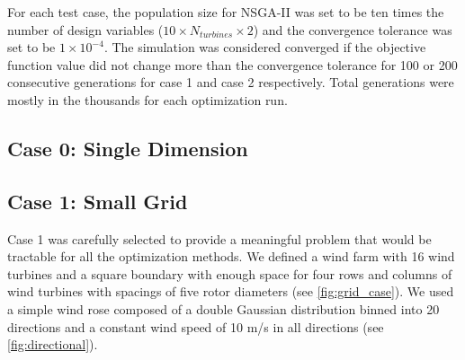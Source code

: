 \documentclass[a4paper]{jpconf}
\begin{document}
For each test case, the population size for NSGA-II was set to be ten times the number of design variables ($10\times N_{turbines} \times 2$) and the convergence tolerance was set to be $1\times10^{-4}$. The simulation was considered converged if the objective function value did not change more than the convergence tolerance for 100 or 200 consecutive generations for case 1 and case 2 respectively. Total generations were mostly in the thousands for each optimization run.

\subsection{Case 0: Single Dimension}

\subsection{Case 1: Small Grid}
Case 1 was carefully selected to provide a meaningful problem that would be tractable for all the optimization methods. We defined a wind farm with 16 wind turbines and a square boundary with enough space for four rows and columns of wind turbines with spacings of five rotor diameters (see \cref{fig:grid_case}). We used a simple wind rose composed of a double Gaussian distribution binned into 20 directions and a constant wind speed of 10 m/s in all directions (see \cref{fig:directional}).
\end{document}
